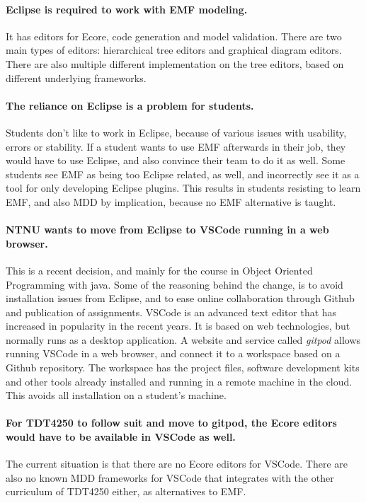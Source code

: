 \paragraph{\Gls{Eclipse} is required to work with \acrshort{EMF} modeling.}
It has editors for \gls{Ecore}, code generation and model validation.
There are two main types of editors: hierarchical tree editors and graphical diagram editors.
There are also multiple different implementation on the tree editors, based on different underlying frameworks.

\paragraph{The reliance on \gls{Eclipse} is a problem for students.}
Students don't like to work in Eclipse, because of various issues with usability, errors or stability. %
If a student wants to use \acrshort{EMF} afterwards in their job, they would have to use \gls{Eclipse}, and also convince their team to do it as well.
Some students see \acrshort{EMF} as being too \gls{Eclipse} related, as well, and incorrectly see it as a tool for only developing Eclipse plugins.
This results in students resisting to learn \acrshort{EMF}, and also \acrshort{MDD} by implication, because no \acrshort{EMF} alternative is taught.

\paragraph{\acrshort{NTNU} wants to move from \gls{Eclipse} to \gls{VSCode}  running in a web browser.}
This is a recent decision, and mainly for the course in Object Oriented Programming with java.
Some of the reasoning behind the change, is to avoid installation issues from \gls{Eclipse}, and to ease online collaboration through Github and publication of assignments. %
\gls{VSCode} is an advanced text editor that has increased in popularity in the recent years.
It is based on web technologies, but normally runs as a desktop application.
A website and service called \textit{gitpod} allows running \gls{VSCode} in a web browser, and connect it to a workspace based on a Github repository.
The workspace has the project files, software development kits and other tools already installed and running in a remote machine in the \gls{cloud}.
This avoids all installation on a student's machine.

\paragraph{For \gls{TDT4250} to follow suit and move to gitpod, the \gls{Ecore} editors would have to be available in \gls{VSCode} as well.}
The current situation is that there are no \gls{Ecore} editors for \gls{VSCode}.
There are also no known \acrshort{MDD} frameworks for \gls{VSCode} that integrates with the other curriculum of \gls{TDT4250} either, as alternatives to \acrshort{EMF}.


